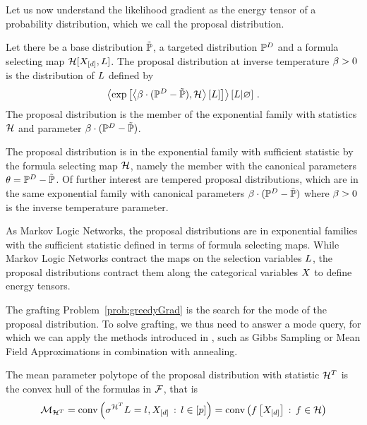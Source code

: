 

Let us now understand the likelihood gradient as the energy tensor of a probability distribution, which we call the proposal distribution.

\begin{definition}
	Let there be a base distribution $\tilde{\mathbb{P}}$, a targeted distribution $\mathbb{P}^{D}$ and a formula selecting map $\mathcal{H}[X_{[d]}, L]$.
	The proposal distribution at inverse temperature $\beta>0$ is the distribution of $L$ defined by
	\begin{align*}
		\left\langle \mathrm{exp}\left[\left\langle \beta\cdot(\mathbb{P}^{D}-\tilde{\mathbb{P}}),\mathcal{H}\right\rangle \left[ L \right]\right] \right\rangle \left[ L | \varnothing \right] \, .
	\end{align*}
	The proposal distribution is the member of the exponential family with statistics $\mathcal{H}$ and parameter $\beta\cdot(\mathbb{P}^{D}-\tilde{\mathbb{P}})$.
\end{definition}


The proposal distribution is in the exponential family with sufficient statistic by the formula selecting map $\mathcal{H}$, namely the member with the canonical parameters $\theta=\mathbb{P}^{D}-\tilde{\mathbb{P}}$.
Of further interest are tempered proposal distributions, which are in the same exponential family with canonical parameters $\beta\cdot(\mathbb{P}^{D}-\tilde{\mathbb{P}})$ where $\beta>0$ is the inverse temperature parameter.

As Markov Logic Networks, the proposal distributions are in exponential families with the sufficient statistic defined in terms of formula selecting maps.
While Markov Logic Networks contract the maps on the selection variables $L$, the proposal distributions contract them along the categorical variables $X$ to define energy tensors.

The grafting Problem~\eqref{prob:greedyGrad} is the search for the mode of the proposal distribution.
To solve grafting, we thus need to answer a mode query, for which we can apply the methods introduced in , such as Gibbs Sampling or Mean Field Approximations in combination with annealing.



The mean parameter polytope of the proposal distribution with statistic $\mathcal{H}^T$ is the convex hull of the formulas in $\mathcal{F}$, that is
\begin{align*}
	\mathcal{M}_{\mathcal{H}^T}
	= \mathrm{conv}\left(\sigma^{\mathcal{H}^T}{L_{}=l_{},X_{[d]}} \, : \, l\in[p]{}\right)
	= \mathrm{conv}\left(f\left[X_{[d]}\right] \, : \, f\in\mathcal{H}\right)
\end{align*}


